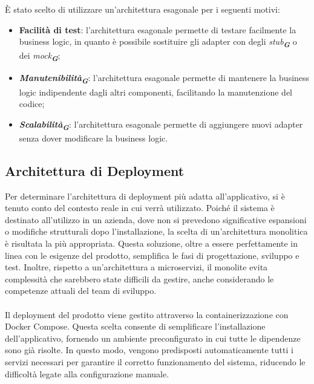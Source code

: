 È stato scelto di utilizzare un'architettura esagonale per i seguenti motivi:
\begin{itemize}
    \item \textbf{Facilità di test}: l'architettura esagonale permette di testare facilmente la business logic, in quanto è possibile sostituire gli adapter con degli \emph{stub}\textsubscript{\textbf{\textit{G}}} o dei \emph{mock}\textsubscript{\textbf{\textit{G}}};
    \item \textbf{\emph{Manutenibilità}}\textsubscript{\textbf{\textit{G}}}: l'architettura esagonale permette di mantenere la business logic indipendente dagli altri componenti, facilitando la manutenzione del codice;
    \item \textbf{\emph{Scalabilità}}\textsubscript{\textbf{\textit{G}}}: l'architettura esagonale permette di aggiungere nuovi adapter senza dover modificare la business logic.
\end{itemize}


\subsection{Architettura di Deployment}
\label{sec:architettura_deployment}

Per determinare l'architettura di deployment più adatta all'applicativo, si è tenuto conto del contesto reale in cui verrà utilizzato. Poiché il sistema è destinato all'utilizzo in un azienda, dove non si prevedono significative espansioni o modifiche strutturali dopo l'installazione, la scelta di un'architettura monolitica è risultata la più appropriata. Questa soluzione, oltre a essere perfettamente in linea con le esigenze del prodotto, semplifica le fasi di progettazione, sviluppo e test. Inoltre, rispetto a un'architettura a microservizi, il monolite evita complessità che sarebbero state difficili da gestire, anche considerando le competenze attuali del team di sviluppo.\\\\
Il deployment del prodotto viene gestito attraverso la containerizzazione con Docker Compose. Questa scelta consente di semplificare l’installazione dell’applicativo, fornendo un ambiente preconfigurato in cui tutte le dipendenze sono già risolte. In questo modo, vengono predisposti automaticamente tutti i servizi necessari per garantire il corretto funzionamento del sistema, riducendo le difficoltà legate alla configurazione manuale.


